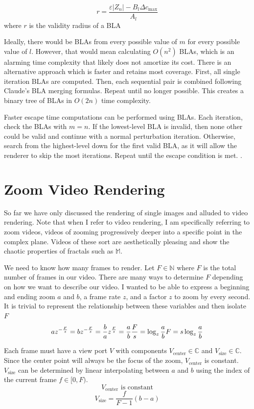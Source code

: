 \documentclass{article}
\begin{document}
\[
    r=\frac{\varepsilon|Z_n| - B_l\Delta c_\text{max}}{A_l}
\]
where $r$ is the validity radius of a BLA
\par Ideally, there would be BLAs from every possible value of $m$ for every possible value of $l$. However, that would mean calculating $O(n^2)$ BLAs, which is an alarming time complexity that likely does not amortize its cost. There is an alternative approach which is faster and retains most coverage. First, all single iteration BLAs are computed. Then, each sequential pair is combined following Claude's BLA merging formulas\cite{Allen_2024}. Repeat until no longer possible. This creates a binary tree of BLAs in $O(2n)$ time complexity. 
\par Faster escape time computations can be performed using BLAs. Each iteration, check the BLAs with $m=n$. If the lowest-level BLA is invalid, then none other could be valid and continue with a normal perturbation iteration. Otherwise, search from the highest-level down for the first valid BLA, as it will allow the renderer to skip the most iterations. Repeat until the escape condition is met. \cite{Thompson_2023}.
\section{Zoom Video Rendering}
\par So far we have only discussed the rendering of single images and alluded to video rendering. Note that when I refer to video rendering, I am specifically referring to zoom videos, videos of zooming progressively deeper into a specific point in the complex plane. Videos of these sort are aesthetically pleasing and show the chaotic properties of fractals such as $\mathbb{M}$.
\par We need to know how many frames to render. Let $F\in\mathbb{N}$ where $F$ is the total number of frames in our video. There are many ways to determine $F$ depending on how we want to describe our video. I wanted to be able to express a beginning and ending zoom $a$ and $b$, a frame rate $z$, and a factor $z$ to zoom by every second. It is trivial to represent the relationship between these variables and then isolate $F$
\[
    az^{-\frac{F}{s}}=b\\
    z^{-\frac{F}{s}}=\frac{b}{a}\\
    z^{\frac{F}{s}}=\frac{a}{b}\\
    \frac{F}{s}=\log_z{\frac{a}{b}}\\
    F=s\log_z{\frac{a}{b}}\\
\]
\par Each frame must have a view port $V$ with components $V_\text{center}\in \mathbb{C}$ and $V_\text{size}\in \mathbb{C}$. Since the center point will always be the focus of the zoom, $V_\text{center}$ is constant. $V_\text{size}$ can be determined by linear interpolating between $a$ and $b$ using the index of the current frame $f\in[0, F)$.
\[ V_\text{center} \text{ is constant} \]
\[ V_\text{size} = \frac{f}{F - 1}(b - a) \]
\end{document}
